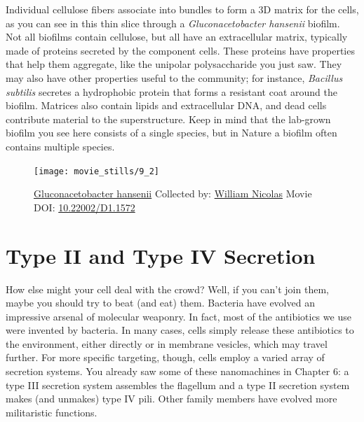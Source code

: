 \documentclass[]{tufte-book}
\begin{document}
Individual cellulose fibers associate into bundles to form a 3D matrix
for the cells, as you can see in this thin slice through a
\emph{Gluconacetobacter hansenii} biofilm. Not all biofilms contain
cellulose, but all have an extracellular matrix, typically made of
proteins secreted by the component cells. These proteins have properties
that help them aggregate, like the unipolar polysaccharide you just saw.
They may also have other properties useful to the community; for
instance, \emph{Bacillus subtilis} secretes a hydrophobic protein that
forms a resistant coat around the biofilm. Matrices also contain lipids
and extracellular DNA, and dead cells contribute material to the
superstructure. Keep in mind that the lab-grown biofilm you see here
consists of a single species, but in Nature a biofilm often contains
multiple species.





\begin{figure}
\texttt{[image: movie\_stills/9\_2]} \caption[\protect\hyperlink{tree}{Gluconacetobacter hansenii} Collected
by: \protect\hyperlink{william_nicolas}{William Nicolas} Movie DOI:
\href{https://doi.org/10.22002/D1.1572}{10.22002/D1.1572}]{\protect\hyperlink{tree}{Gluconacetobacter hansenii} Collected
by: \protect\hyperlink{william_nicolas}{William Nicolas} Movie DOI:
\href{https://doi.org/10.22002/D1.1572}{10.22002/D1.1572}}\label{fig:9-2}
\end{figure}

\section{Type II and Type IV
Secretion}\label{type-ii-and-type-iv-secretion}

How else might your cell deal with the crowd? Well, if you can't join
them, maybe you should try to beat (and eat) them. Bacteria have evolved
an impressive arsenal of molecular weaponry. In fact, most of the
antibiotics we use were invented by bacteria. In many cases, cells
simply release these antibiotics to the environment, either directly or
in membrane vesicles, which may travel further. For more specific
targeting, though, cells employ a varied array of secretion systems. You
already saw some of these nanomachines in Chapter 6: a type III
secretion system assembles the flagellum and a type II secretion system
makes (and unmakes) type IV pili. Other family members have evolved more
militaristic functions.
\end{document}
